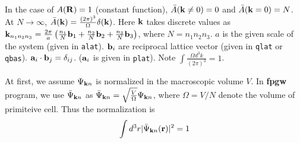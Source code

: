 \documentclass[a4paper,10pt,epsf,fleqn]{article}
\newcommand{\bfk}{{\bf k}}
\newcommand{\bfr}{{\bf r}}
\newcommand{\bfR}{{\bf R}}
\newcommand{\bfa}{{\bf a}}
\newcommand{\bfb}{{\bf b}}
\begin{document}
In the case of $A(\bfR)=1$ (constant function), 
$\bar{A}(\bfk\ne0) = 0$ and $\bar{A}(\bfk=0) = N$.
At $N \to \infty$, 
$\bar{A}(\bfk) = \frac{(2 \pi)^3}{\Omega} \delta(\bfk)$.
Here $\bfk$ takes discrete values as 
$\bfk_{n_1 n_2 n_3}= \frac{2 \pi}{a}
\left( \frac{n_1}{N} \bfb_1 +\frac{n_2}{N} \bfb_2 +\frac{n_3}{N} \bfb_3 \right)$, 
where $N=n_1 n_2 n_3$.
$a$ is the given scale of the system (given in {\tt alat}).
$\bfb_i$ are reciprocal lattice vector (given in {\tt qlat} or {\tt qbas}). 
$ \bfa_i \cdot \bfb_j =\delta_{ij}$. ($ \bfa_i$ is given in {\tt plat}).
Note $\int \frac{ \Omega d^3 k }{(2 \pi)^3} =1$.


At first, we assume $\Psi_{\bfk n}$ is normalized in the macroscopic volume $V$. 
In {\bf fpgw} program, we use $\bar\Psi_{\bfk n}$ as
$\bar{\Psi}_{\bfk n}= \sqrt{\frac{V}{\Omega}} {\Psi}_{\bfk n}$,
where $\Omega=V/N$ denote the volume of primiteive cell.
Thus the normalization is
\begin{eqnarray}
\int d^3 r  |\bar{\Psi}_{\bfk n}(\bfr)|^2 =1
\end{eqnarray}
\end{document}
